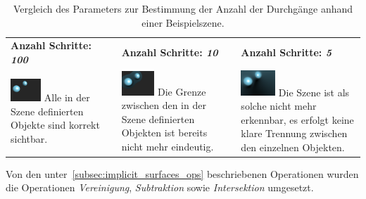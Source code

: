 \begin{table}[H]
    \centering
    \caption{Vergleich des Parameters zur Bestimmung der Anzahl der
        Durchgänge anhand einer Beispielszene.}\label{table:sphere_tracing_steps}
    \begin{tabular}{p{}p{}p{}}
        \toprule
            \textbf{Anzahl Schritte: \textit{100}} &
            \textbf{Anzahl Schritte: \textit{10}}  &
            \textbf{Anzahl Schritte: \textit{5}}   \\
        \cmidrule(r){1-1}\cmidrule(lr){2-2}\cmidrule(l){3-3}
            \includegraphics[width=0.3\textwidth]{img/sphere_tracing_steps_full.pdf} \newline
            Alle in der Szene definierten Objekte sind korrekt sichtbar. &
            \includegraphics[width=0.3\textwidth]{img/sphere_tracing_steps_less.pdf} \newline
            Die Grenze zwischen den in der Szene definierten Objekten
            ist bereits nicht mehr eindeutig. &
            \includegraphics[width=0.3\textwidth]{img/sphere_tracing_steps_min.pdf} \newline
            Die Szene ist als solche nicht mehr erkennbar, es erfolgt
            keine klare Trennung zwischen den einzelnen Objekten.  \\
        \bottomrule
    \end{tabular}
\end{table}

Von den unter~\autoref{subsec:implicit_surfaces_ops} beschriebenen
Operationen wurden die Operationen \textit{Vereinigung}, \textit{Subtraktion} sowie
\textit{Intersektion} umgesetzt.

